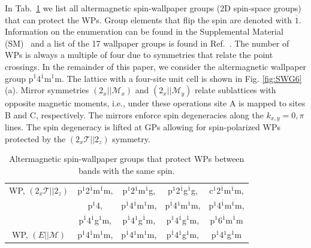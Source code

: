 \documentclass[aps,prb,twocolumn,amsmath,amssymb,floatfix]{revtex4-2}
\begin{document}
In Tab.~\ref{Weyl_point_classification_new} we list all altermagnetic spin-wallpaper groups (2D spin-space groups) that can protect the WPs. Group elements that flip the spin are denoted with $\overline{1}$. Information on the enumeration can be found in the 
Supplemental Material (SM)~\cite{sm_note} and a list of the 17 wallpaper groups is found in Ref.~\cite{2016Itfc}. 
The number of WPs is always a multiple of four due to symmetries that relate the point crossings. In the remainder of this paper, we consider the altermagnetic wallpaper group p$^{\overline{1}}$4$^{\overline{1}}$m$^1$m. 
The lattice with a four-site unit cell is shown in Fig. \ref{fig:SWG6}(a). 
Mirror symmetries $(2_x||\mathcal{M}_x)$ and $ (2_x||\mathcal{M}_y)$ relate sublattices with opposite magnetic moments, i.e., under these operations site A is mapped to sites B and C, respectively. The mirrors enforce spin degeneracies along the $k_{x,y}=0,\pi$ lines. 
The spin degeneracy is lifted at GPs allowing for spin-polarized WPs protected by the $(2_x\mathcal{T}||2_z)$ symmetry. 
\begin{table}[t!]
\centering
\renewcommand{\arraystretch}{1.5} 
\begin{tabular}{ |c|cccc| } 
 \hline
 WP,  $(2_x\mathcal{T}||2_z)$ & p$^1$2$^{\overline{1}}$m$^{\overline{1}}$m, & p$^1$2$^{\overline{1}}$m$^{\overline{1}}$g, & p$^1$2$^{\overline{1}}$g$^{\overline{1}}$g, & c$^1$2$^{\overline{1}}$m$^{\overline{1}}$m,\\
 &p$^{\overline{1}}$4, & p$^{\overline{1}}$4$^{\overline{1}}$m$^1$m, & p$^{\overline{1}}$4$^1$m$^{\overline{1}}$m, & p$^1$4$^{\overline{1}}$m$^{\overline{1}}$m,\\
 &p$^{\overline{1}}$4$^{\overline{1}}$g$^1$m, & p$^{\overline{1}}$4$^1$g$^{\overline{1}}$m, & p$^1$4$^{\overline{1}}$g$^{\overline{1}}$m, &  p$^1$6$^{\overline{1}}$m$^{\overline{1}}$m \\
 \hline
 WP, $(E||\mathcal{M})$ & p$^{\overline{1}}$4$^{\overline{1}}$m$^1$m,&  p$^{\overline{1}}$4$^1$m$^{\overline{1}}$m, & p$^{\overline{1}}$4$^{\overline{1}}$g$^1$m, &  p$^{\overline{1}}$4$^1$g$^{\overline{1}}$m \\
 \hline
\end{tabular}
\caption{\justifying Altermagnetic spin-wallpaper groups that protect WPs between bands with the same spin. }\label{Weyl_point_classification_new}
\end{table}
\end{document}
